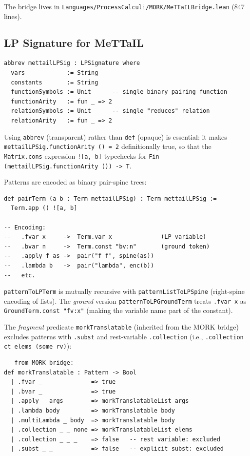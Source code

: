 \documentclass[]{article}
\newcommand{\code}[1]{\texttt{#1}}
\newcommand{\MeTTaIL}{\textup{MeTTaIL}}
\begin{document}
The bridge lives in \code{Languages/ProcessCalculi/MORK/MeTTaILBridge.lean} (847 lines).

\subsection{LP Signature for \MeTTaIL{}}

\begin{lstlisting}[language=lean]
abbrev mettailLPSig : LPSignature where
  vars            := String
  constants       := String
  functionSymbols := Unit      -- single binary pairing function
  functionArity   := fun _ => 2
  relationSymbols := Unit      -- single "reduces" relation
  relationArity   := fun _ => 2
\end{lstlisting}

Using \code{abbrev} (transparent) rather than \code{def} (opaque) is essential:
it makes \code{mettailLPSig.functionArity () = 2} definitionally true, so that
the \code{Matrix.cons} expression \code{![a, b]} typechecks for
\code{Fin (mettailLPSig.functionArity ()) -> T}.

Patterns are encoded as binary pair-spine trees:

\begin{lstlisting}[language=lean]
def pairTerm (a b : Term mettailLPSig) : Term mettailLPSig :=
  Term.app () ![a, b]

-- Encoding:
--   .fvar x     ->  Term.var x              (LP variable)
--   .bvar n     ->  Term.const "bv:n"       (ground token)
--   .apply f as ->  pair("f_f", spine(as))
--   .lambda b   ->  pair("lambda", enc(b))
--   etc.
\end{lstlisting}

\code{patternToLPTerm} is mutually recursive with \code{patternListToLPSpine}
(right-spine encoding of lists).  The \emph{ground} version
\code{patternToLPGroundTerm} treats \code{.fvar x} as \code{GroundTerm.const "fv:x"}
(making the variable name part of the constant).

The \emph{fragment} predicate \code{morkTranslatable} (inherited from the MORK
bridge) excludes patterns with \code{.subst} and rest-variable
\code{.collection} (i.e., \code{.collection ct elems (some rv)}):

\begin{lstlisting}[language=lean]
-- from MORK bridge:
def morkTranslatable : Pattern -> Bool
  | .fvar _              => true
  | .bvar _              => true
  | .apply _ args        => morkTranslatableList args
  | .lambda body         => morkTranslatable body
  | .multiLambda _ body  => morkTranslatable body
  | .collection _ _ none => morkTranslatableList elems
  | .collection _ _ _    => false   -- rest variable: excluded
  | .subst _ _           => false   -- explicit subst: excluded
\end{lstlisting}
\end{document}

